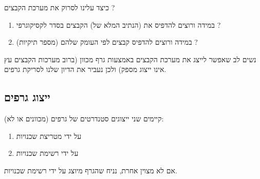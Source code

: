 כיצד עלינו לסרוק את מערכת הקבצים ? 
\begin{enumerate}
\item
במידה ורוצים להדפיס את (הנתיב המלא של) הקבצים בסדר לקסיקוגרפי ?
\item
במידה ורוצים להדפיס קבצים לפי העומק שלהם (מספר תיקיות) ?
\end{enumerate}
נשים לב שאפשר לייצג את מערכת הקבצים באמצעות גרף מכוון (ברוב מערכות הקבצים עץ אינו ייצוג מספק)
ולכן נעביר את הדיון שלנו לסריקת גרפים.

\subsection*{ייצוג גרפים}
קיימים שני ייצוגים סטנדרטים של גרפים (מכוונים או לא):
\begin{enumerate}
\item
על ידי מטריצת שכנויות
\item
על ידי רשימת שכנויות
\end{enumerate}

אם לא מצוין אחרת, נניח שהגרף מיוצג על ידי רשימת שכנויות.

